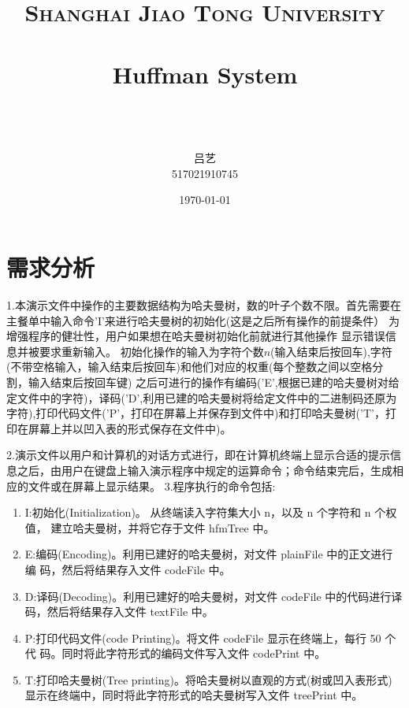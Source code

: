 \documentclass[paper=a4, fontsize=11pt]{scrartcl} %
\title{
\normalfont \normalsize
\textsc{Shanghai Jiao Tong University} \\ [25pt] %
\horrule{0.5pt} \\[0.4cm] %
\huge Huffman System \\ %
\horrule{2pt} \\[0.5cm] %
}
\author{\\ \kaishu 吕艺\\ \normalsize 517021910745} %
\date{\normalsize\today} %
\numberwithin{equation}{section} %
\numberwithin{figure}{section} %
\numberwithin{table}{section} %
\begin{document}
\maketitle %
\kaishu
\section{需求分析}

1.本演示文件中操作的主要数据结构为哈夫曼树，数的叶子个数不限。首先需要在主餐单中输入命令'I'来进行哈夫曼树的初始化(这是之后所有操作的前提条件）
为增强程序的健壮性，用户如果想在哈夫曼树初始化前就进行其他操作
显示错误信息并被要求重新输入。
初始化操作的输入为字符个数$n$(输入结束后按回车),字符(不带空格输入，输入结束后按回车)和他们对应的权重(每个整数之间以空格分割，输入结束后按回车键)
之后可进行的操作有编码('E',根据已建的哈夫曼树对给定文件中的字符)，译码('D',利用已建的哈夫曼树将给定文件中的二进制码还原为字符),打印代码文件('P'，打印在屏幕上并保存到文件中)和打印哈夫曼树('T'，打印在屏幕上并以凹入表的形式保存在文件中)。
\vspace{0.5cm}

2.演示文件以用户和计算机的对话方式进行，即在计算机终端上显示合适的提示信息之后，由用户在键盘上输入演示程序中规定的运算命令；命令结束完后，生成相应的文件或在屏幕上显示结果。
\vspace{0.5cm}
\newpage
3.程序执行的命令包括:
\begin{enumerate}
    \item I:初始化(Initialization)。 从终端读入字符集大小 n，以及 n 个字符和 n 个权值， 建立哈夫曼树，并将它存于文件 hfmTree 中。
    \item E:编码(Encoding)。利用已建好的哈夫曼树，对文件 plainFile 中的正文进行编 码，然后将结果存入文件 codeFile 中。
    \item D:译码(Decoding)。利用已建好的哈夫曼树，对文件 codeFile 中的代码进行译 码，然后将结果存入文件 textFile 中。
    \item P:打印代码文件(code Printing)。将文件 codeFile 显示在终端上，每行 50 个代 码。同时将此字符形式的编码文件写入文件 codePrint 中。
    \item T:打印哈夫曼树(Tree printing)。将哈夫曼树以直观的方式(树或凹入表形式) 显示在终端中，同时将此字符形式的哈夫曼树写入文件 treePrint 中。
\end{enumerate}

\vspace{0.3pt}
\end{document}
